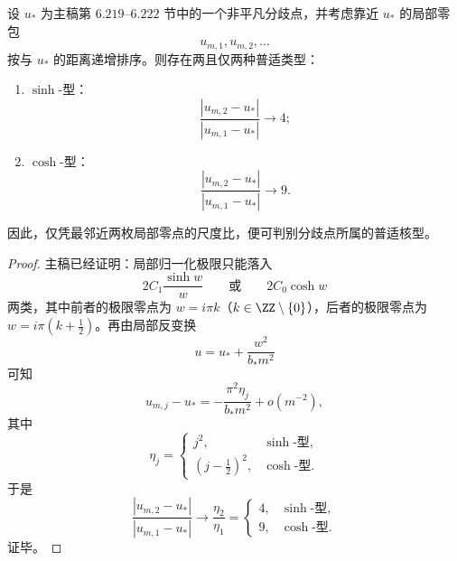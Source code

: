 \begin{theorem}\label{thm:conclusion-leyang-local-doublezero-binary-classification}
设 \(u_\ast\) 为主稿第 \(6.219\)–\(6.222\) 节中的一个非平凡分歧点，并考虑靠近 \(u_\ast\) 的局部零包
\[
u_{m,1},u_{m,2},\dots
\]
按与 \(u_\ast\) 的距离递增排序。则存在两且仅两种普适类型：
\begin{enumerate}
  \item \(\sinh\)-型：
  \[
  \frac{|u_{m,2}-u_\ast|}{|u_{m,1}-u_\ast|}\longrightarrow 4;
  \]
  \item \(\cosh\)-型：
  \[
  \frac{|u_{m,2}-u_\ast|}{|u_{m,1}-u_\ast|}\longrightarrow 9.
  \]
\end{enumerate}
因此，仅凭最邻近两枚局部零点的尺度比，便可判别分歧点所属的普适核型。
\end{theorem}
\begin{proof}
主稿已经证明：局部归一化极限只能落入
\[
2C_1\frac{\sinh w}{w}
\qquad\text{或}\qquad
2C_0\cosh w
\]
两类，其中前者的极限零点为 \(w=i\pi k\)（\(k\in\ZZ\setminus\{0\}\)），后者的极限零点为 \(w=i\pi(k+\tfrac12)\)。再由局部反变换
\[
u=u_\ast+\frac{w^2}{b_\ast m^2}
\]
可知
\[
u_{m,j}-u_\ast
=
-\frac{\pi^2\eta_j}{b_\ast m^2}+o(m^{-2}),
\]
其中
\[
\eta_j=
\begin{cases}
j^2,& \sinh\text{-型},\\[2mm]
\left(j-\tfrac12\right)^2,& \cosh\text{-型}.
\end{cases}
\]
于是
\[
\frac{|u_{m,2}-u_\ast|}{|u_{m,1}-u_\ast|}
\longrightarrow
\frac{\eta_2}{\eta_1}
=
\begin{cases}
4,& \sinh\text{-型},\\
9,& \cosh\text{-型}.
\end{cases}
\]
证毕。
\end{proof}

